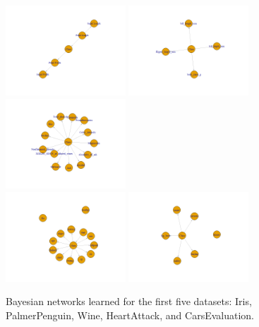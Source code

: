 \documentclass[runningheads]{llncs}
\begin{document}
\begin{figure}[htbp]
	\centering
	\includegraphics[width=0.4\textwidth]{IMG/1RED.png}
	\includegraphics[width=0.4\textwidth]{IMG/2RED.png}
	\includegraphics[width=0.4\textwidth]{IMG/3RED.png}\\[1ex]
	\includegraphics[width=0.4\textwidth]{IMG/4RED.png}
	\includegraphics[width=0.4\textwidth]{IMG/5RED.png}
	\caption{Bayesian networks learned for the first five datasets: Iris, PalmerPenguin, Wine, HeartAttack, and CarsEvaluation.}
	\label{fig:networks_part1}
\end{figure}
\end{document}

